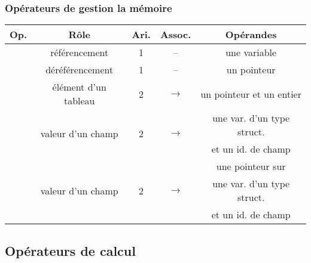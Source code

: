 \begin{frame}[fragile]
\frametitle{Opérateurs de gestion la mémoire}

\begin{center}
    \begin{tabular}{c|c|c|c|c}
        {\bf Op.} & {\bf Rôle} & {\bf Ari.} & {\bf Assoc.}
            & {\bf Opérandes} \\ \hline \hline
        \Code{\&} & référencement & 1 & -- & une variable \\ \hline
        \Code{*} & déréférencement & 1 & -- & un pointeur \\ \hline
        \Code{[\,]} & élément d'un tableau & 2 & $\longrightarrow$
            & un pointeur et un entier \\ \hline
        \multirow{2}{*}{\Code{.}} & \multirow{2}{*}{valeur d'un champ} &
            \multirow{2}{*}{2} & \multirow{2}{*}{$\longrightarrow$}
            & une var. d'un type struct. \\
            & & & & et un id. de champ \\ \hline
        \multirow{3}{*}{\Code{->}} & \multirow{3}{*}{valeur d'un champ} &
            \multirow{3}{*}{2} & \multirow{3}{*}{$\longrightarrow$}
            & une pointeur sur \\
            & & & & une var. d'un type struct. \\
            & & & & et un id. de champ
    \end{tabular}
\end{center}
\end{frame}

\subsection{Opérateurs de calcul}

